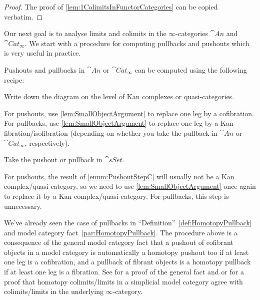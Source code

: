 \begin{proof}
	The proof of \cref{lem:1ColimitsInFunctorCategories} can be copied verbatim.
\end{proof}
Our next goal is to analyse limits and colimits in the $\infty$-categories $\cat{An}$ and $\cat{Cat}_\infty$. We start with a procedure for computing pullbacks and pushouts which is very useful in practice.
\begin{numpar}\label{par:HomotopyPushout}
	Pushouts and pullbacks in $\cat{An}$ or $\cat{Cat}_\infty$ can be computed using the following recipe:
	\begin{alphanumerate}
		\item Write down the diagram on the level of Kan complexes or quasi-categories.\label{enum:PushoutStepA}
		\item For pushouts, use \cref{lem:SmallObjectArgument} to replace one leg by a cofibration. For pullbacks, use \cref{lem:SmallObjectArgument} to replace one leg by a Kan fibration/isofibration (depending on whether you take the pullback in $\cat{An}$ or $\cat{Cat}_\infty$, respectively).\label{enum:PushoutStepB}
		\item Take the pushout or pullback in $\cat{sSet}$.\label{enum:PushoutStepC}
		\item For pushouts, the result of \cref{enum:PushoutStepC} will usually not be a Kan complex/quasi-category, so we need to use \cref{lem:SmallObjectArgument} once again to replace it by a Kan complex/quasi-category. For pullbacks, this step is unnecessary.\label{enum:PushoutStepD}
	\end{alphanumerate}
	We've already seen the case of pullbacks in \enquote{Definition}~\cref{def:HomotopyPullback} and model category fact~\cref{par:HomotopyPullback}. The procedure above is a consequence of the general model category fact that a pushout of cofibrant objects in a model category is automatically a homotopy pushout too if at least one leg is a cofibration, and a pullback of fibrant objects is a homotopy pullback if at least one leg is a fibration. See \cite[Corollary~{\href{https://cisinski.app.uni-regensburg.de/CatLR.pdf\#thm.2.3.28}{2.3.28}}]{Cisinski} for a proof of the general fact and \cite[Theorem~, Remark~]{HTT} or \cite[Theorem~X.21]{HigherCatsII} for a proof that homotopy colimits/limits in a simplicial model category agree with colimits/limits in the underlying $\infty$-category.
	

\end{numpar}
